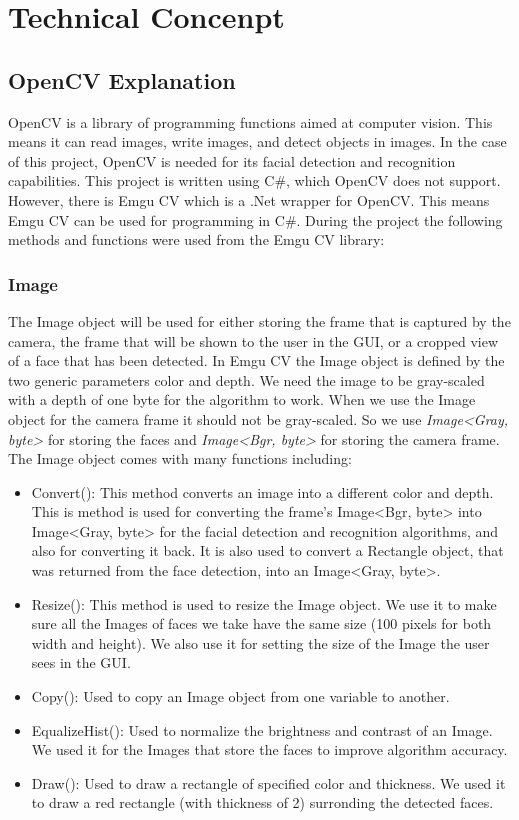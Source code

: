 \documentclass[12pt, a4paper]{article}
\begin{document}
\newpage



\section{Technical Concenpt}
\subsection{OpenCV Explanation}
OpenCV is a library of programming functions aimed at computer vision. This means it can read images, write images, and detect objects in images. In the case of this project, OpenCV is needed for its facial detection and recognition capabilities. This project is written using C\#, which OpenCV does not support. However, there is Emgu CV which is a .Net wrapper for OpenCV. This means Emgu CV can be used for programming in C\#. During the project the following methods and functions were used from the Emgu CV library:
\subsubsection{Image}
The Image object will be used for either storing the frame that is captured by the camera, the frame that will be shown to the user in the GUI, or a cropped view of a face that has been detected.  In Emgu CV the Image object is defined by the two generic parameters color and depth. We need the image to be gray-scaled with a depth of one byte for the algorithm to work. When we use the Image object for the camera frame it should not be gray-scaled. So we use \textit{Image\textless Gray, byte\textgreater} for storing the faces and \textit{Image\textless Bgr, byte\textgreater} for storing the camera frame. The Image object comes with many functions including:
\begin{itemize}
\item Convert(): This method converts an image into a different color and depth. This is method is used for converting the frame’s Image<Bgr, byte> into Image<Gray, byte> for the facial detection and recognition algorithms, and also for converting it back. It is also used to convert a Rectangle object, that was returned from the face detection, into an Image<Gray, byte>.
\item Resize(): This method is used to resize the Image object. We use it to make sure all the Images of faces we take have the same size (100 pixels for both width and height). We also use it for setting the size of the Image the user sees in the GUI.
\item Copy(): Used to copy an Image object from one variable to another.
\item EqualizeHist(): Used to normalize the brightness and contrast of an Image. We used it for the Images that store the faces to improve algorithm accuracy.
\item Draw(): Used to draw a rectangle of specified color and thickness. We used it to draw a red rectangle (with thickness of 2) surronding the detected faces.
\end{itemize}
\end{document}
